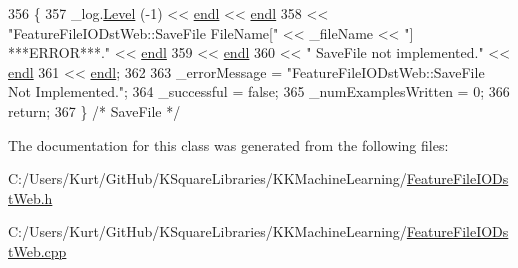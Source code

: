 \begin{DoxyCode}
356 \{
357   \_log.\hyperlink{class_k_k_b_1_1_run_log_a32cf761d7f2e747465fd80533fdbb659}{Level} (-1) << \hyperlink{namespace_k_k_b_ad1f50f65af6adc8fa9e6f62d007818a8}{endl} << \hyperlink{namespace_k_k_b_ad1f50f65af6adc8fa9e6f62d007818a8}{endl}
358                   << \textcolor{stringliteral}{"FeatureFileIODstWeb::SaveFile     FileName["} << \_fileName << \textcolor{stringliteral}{"]           
       ***ERROR***."} << \hyperlink{namespace_k_k_b_ad1f50f65af6adc8fa9e6f62d007818a8}{endl}
359                   << \hyperlink{namespace_k_k_b_ad1f50f65af6adc8fa9e6f62d007818a8}{endl}
360                   << \textcolor{stringliteral}{"                       SaveFile   not implemented."} << 
      \hyperlink{namespace_k_k_b_ad1f50f65af6adc8fa9e6f62d007818a8}{endl}
361                   << \hyperlink{namespace_k_k_b_ad1f50f65af6adc8fa9e6f62d007818a8}{endl};
362 
363   \_errorMessage = \textcolor{stringliteral}{"FeatureFileIODstWeb::SaveFile    Not Implemented."};
364   \_successful = \textcolor{keyword}{false};
365   \_numExamplesWritten = 0;
366   \textcolor{keywordflow}{return};
367 \}  \textcolor{comment}{/* SaveFile */}
\end{DoxyCode}


The documentation for this class was generated from the following files\+:\begin{DoxyCompactItemize}
\item 
C\+:/\+Users/\+Kurt/\+Git\+Hub/\+K\+Square\+Libraries/\+K\+K\+Machine\+Learning/\hyperlink{_feature_file_i_o_dst_web_8h}{Feature\+File\+I\+O\+Dst\+Web.\+h}\item 
C\+:/\+Users/\+Kurt/\+Git\+Hub/\+K\+Square\+Libraries/\+K\+K\+Machine\+Learning/\hyperlink{_feature_file_i_o_dst_web_8cpp}{Feature\+File\+I\+O\+Dst\+Web.\+cpp}\end{DoxyCompactItemize}
